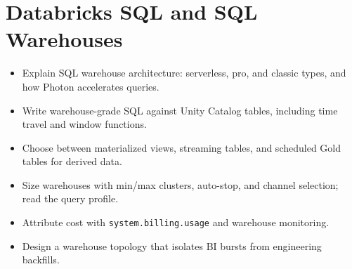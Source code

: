 \chapter{Databricks SQL and SQL Warehouses}
%
%
\begin{objectives}
\begin{itemize}
    \item Explain SQL warehouse architecture: serverless, pro, and classic types, and how Photon accelerates queries.
    \item Write warehouse-grade SQL against Unity Catalog tables, including time travel and window functions.
    \item Choose between materialized views, streaming tables, and scheduled Gold tables for derived data.
    \item Size warehouses with min/max clusters, auto-stop, and channel selection; read the query profile.
    \item Attribute cost with \texttt{system.billing.usage} and warehouse monitoring.
    \item Design a warehouse topology that isolates BI bursts from engineering backfills.
\end{itemize}
\end{objectives}

